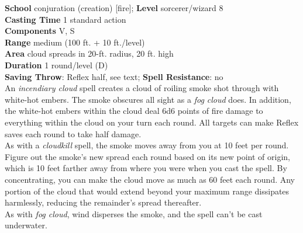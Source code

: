 \textbf{School} conjuration (creation) [fire]; \textbf{Level} sorcerer/wizard 8\\
\textbf{Casting Time }1 standard action\\
\textbf{Components }V, S\\
\textbf{Range }medium (100 ft. + 10 ft./level)\\
\textbf{Area }cloud spreads in 20-ft. radius, 20 ft. high\\
\textbf{Duration }1 round/level (D)\\
\textbf{Saving Throw}: Reflex half, see text; \textbf{Spell Resistance}: no\\
An \textit{incendiary cloud }spell creates a cloud of roiling smoke shot through with white-hot embers. The smoke obscures all sight as a \textit{fog cloud }does. In addition, the white-hot embers within the cloud deal 6d6 points of fire damage to everything within the cloud on your turn each round. All targets can make Reflex saves each round to take half damage.\\
As with a \textit{cloudkill }spell, the smoke moves away from you at 10 feet per round. Figure out the smoke's new spread each round based on its new point of origin, which is 10 feet farther away from where you were when you cast the spell. By concentrating, you can make the cloud move as much as 60 feet each round. Any portion of the cloud that would extend beyond your maximum range dissipates harmlessly, reducing the remainder's spread thereafter.\\
As with \textit{fog cloud}, wind disperses the smoke, and the spell can't be cast underwater.\\
